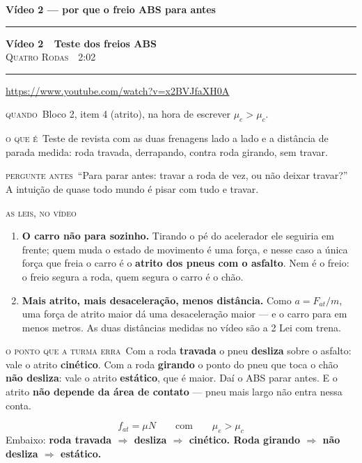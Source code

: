 \documentclass[11pt,a4paper]{article}
\newcommand{\secao}[1]{%
  \needspace{7\baselineskip}
  \vspace{1.8em}
  {\Large\bfseries #1}\\[-0.55em]
  {\color{black!30}\rule{\linewidth}{0.5pt}}
  \par\nobreak\smallskip
}
\newcommand{\video}[5]{%
  \needspace{8\baselineskip}
  \par\addvspace{1.4em}
  {\large\bfseries\color{vinho}V\'ideo #1 \,\textemdash\, #2}\\[0.1em]
  {\small\scshape\color{grafite}#3 \,\textperiodcentered\, #4}\\[-0.5em]
  {\color{black!25}\rule{\linewidth}{0.4pt}}
  \par\nobreak\smallskip
  {\small\url{#5}}
  \par\smallskip
}
\newcommand{\campo}[2]{%
  \par{\small\scshape\color{vinho}#1}\ #2\par}
\begin{document}
\newpage

\secao{V\'ideo 2 --- por que o freio ABS para antes}

\video{2}{Teste dos freios ABS}{Quatro
Rodas}{2:02}{https://www.youtube.com/watch?v=x2BVJfaXH0A}

\campo{quando}{Bloco 2, item 4 (atrito), na hora de escrever
$\mu_e > \mu_c$.}

\campo{o que \'e}{Teste de revista com as duas frenagens lado a lado e a
dist\^ancia de parada medida: roda travada, derrapando, contra roda
girando, sem travar.}

\campo{pergunte antes}{``Para parar antes: travar a roda de vez, ou
n\~ao deixar travar?'' A intui\c{c}\~ao de quase todo mundo \'e pisar
com tudo e travar.}

\campo{as leis, no v\'ideo}{}

\begin{enumerate}[leftmargin=2.4em, itemsep=0.55em]
  \item[\textbf{1\textordfeminine{}}] \textbf{O carro n\~ao para
        sozinho.} Tirando o p\'e do acelerador ele seguiria em frente;
        quem muda o estado de movimento \'e uma for\c{c}a, e nesse caso
        a \'unica for\c{c}a que freia o carro \'e o \textbf{atrito dos
        pneus com o asfalto}. Nem \'e o freio: o freio segura a roda,
        quem segura o carro \'e o ch\~ao.

  \item[\textbf{2\textordfeminine{}}] \textbf{Mais atrito, mais
        desacelera\c{c}\~ao, menos dist\^ancia.} Como
        $a = F_{at}/m$, uma for\c{c}a de atrito maior d\'a uma
        desacelera\c{c}\~ao maior --- e o carro para em menos metros. As
        duas dist\^ancias medidas no v\'ideo s\~ao a 2\textordfeminine{}
        Lei com trena.
\end{enumerate}

\campo{o ponto que a turma erra}{Com a roda \textbf{travada} o pneu
\textbf{desliza} sobre o asfalto: vale o atrito \textbf{cin\'etico}. Com
a roda \textbf{girando} o ponto do pneu que toca o ch\~ao \textbf{n\~ao
desliza}: vale o atrito \textbf{est\'atico}, que \'e maior. Da\'i o ABS
parar antes. E o atrito \textbf{n\~ao depende da \'area de contato} ---
pneu mais largo n\~ao entra nessa conta.}

\begin{quadro}
\[
  f_{at} = \mu N \qquad\text{com}\qquad \mu_e > \mu_c
\]
Embaixo: \textbf{roda travada $\Rightarrow$ desliza $\Rightarrow$
cin\'etico. Roda girando $\Rightarrow$ n\~ao desliza $\Rightarrow$
est\'atico.}
\end{quadro}
\end{document}
